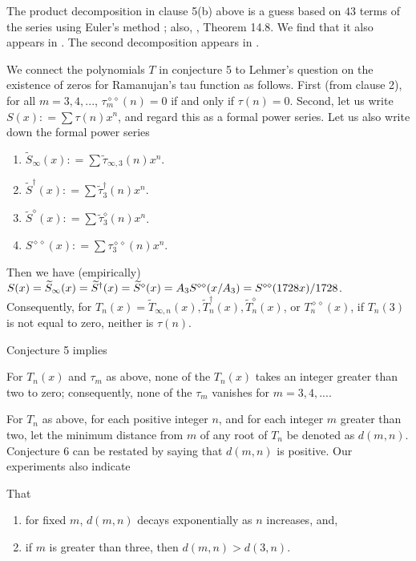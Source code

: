 \documentclass{article}
\begin{document}
\noindent
The product decomposition in clause 5(b) above
is a guess based on $43$ terms of the series
using Euler's method \cite{eulerdiscovery};
also, \cite{apostolIntroduction}, Theorem 14.8.
We find that it also appears in
\cite{OEIS6}. The second decomposition
appears in \cite{OEIS7}.
 \begin{remark} We connect the polynomials $T$
 in conjecture 5 to Lehmer's question on the
 existence of zeros for Ramanujan's tau function
 as follows. First (from clause 2), for all 
 $m = 3, 4, ...$,
 $\tau^{\diamond \diamond}_m(n) = 0$
 if and only if $\tau(n) = 0$. Second, let us write 
 $S(x): = \sum \tau(n) x^n$, and regard this as a 
 formal power series.
 Let us also write down the formal power series
 \begin{enumerate}
  \item
 $\widetilde{S}_{\infty}(x): = \sum \tilde{\tau}_{\infty,3}(n) x^n$.
  \item
 $\widetilde{S}^{\dagger}(x): = \sum \tilde{\tau}^{\dagger}_3(n) x^n$.
 \item
 $\widetilde{S}^{\diamond}(x): = \sum \widetilde{\tau}^{\diamond}_3(n) x^n$.
 \item
 $S^{\diamond \diamond}(x): = \sum \tau^{\diamond \diamond}_3(n) x^n$.
 \end{enumerate}
 Then we have (empirically)
 $S(x) = \widetilde{S}_{\infty}(x) = 
 \widetilde{S}^{\dagger}(x) = \widetilde{S}^{\diamond}(x) =
 A_3 S^{\diamond \diamond}(x/A_3) = \newline
 S^{\diamond \diamond}(1728x)/1728$. Consequently, 
 for $T_n(x) = 
 \widetilde{T}_{\infty,n}(x), \widetilde{T}^{\dagger}_n(x),
 \widetilde{T}^{\diamond}_n(x)$, 
or $T^{\diamond \diamond}_n(x)$, 
if  $T_n(3)$ is not equal to zero,
neither is $\tau(n)$.
 \end{remark} \noindent
 Conjecture 5 implies
\begin{conjecture}
For $T_n(x)$ and  $\tau_m$ as above, 
none of the $T_n(x)$ takes an integer 
greater than two
to zero; consequently, none of the $\tau_m$ vanishes
for $m = 3, 4, ....$
\end{conjecture} \noindent
For $T_n$ as above,
for each positive integer $n$, and for
each integer $m$ greater than two,
let the minimum distance from $m$
of any root of $T_n$ be denoted as
$d(m,n)$. Conjecture 6
can be restated by saying that $d(m,n)$ is positive. 
Our experiments also indicate 
\begin{conjecture}
That
\begin{enumerate}
 \item
 for fixed $m$,  $d(m,n)$ decays exponentially as 
 $n$ increases, and,  
 \item if $m$ is greater
than three, then $d(m,n) > d(3,n)$.
\end{enumerate}
\end{conjecture}
\end{document}
